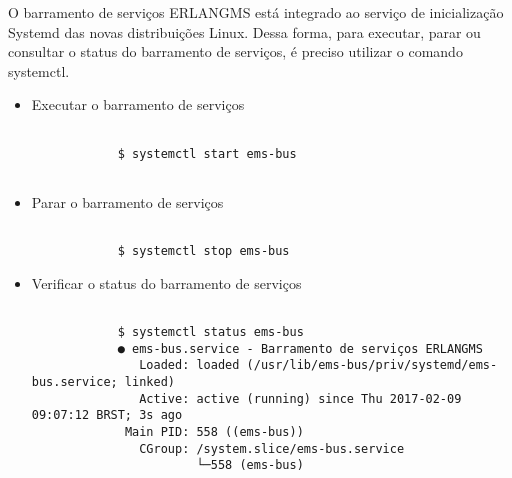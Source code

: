 O barramento de
serviços ERLANGMS está integrado ao serviço de inicialização Systemd das novas distribuições Linux. Dessa forma,
para executar, parar ou consultar o status do barramento de serviços,
é preciso utilizar o comando systemctl.

\begin{itemize}


	\item  Executar o barramento de serviços

	
		\renewcommand{\lstlistingname}{Código}             
		\begin{lstlisting}[Executar o barramento de serviços, label=exec_emsbus] 

			$ systemctl start ems-bus
			
		\end{lstlisting}	

	
	\item  Parar o barramento de serviços
	
		\renewcommand{\lstlistingname}{Código}             
		\begin{lstlisting}[Parar o barramento de serviços, label=stop_emsbus] 

			$ systemctl stop ems-bus

		\end{lstlisting}	
	

	\item  Verificar o status do barramento de serviços
	
		\renewcommand{\lstlistingname}{Código}             
		\begin{lstlisting}[Verificar o status do barramento de serviços, label=status_emsbus] 

			$ systemctl status ems-bus
			● ems-bus.service - Barramento de serviços ERLANGMS
			   Loaded: loaded (/usr/lib/ems-bus/priv/systemd/ems-bus.service; linked)
			   Active: active (running) since Thu 2017-02-09 09:07:12 BRST; 3s ago
			 Main PID: 558 ((ems-bus))
			   CGroup: /system.slice/ems-bus.service
					   └─558 (ems-bus)			

		\end{lstlisting}	
		
		
	
\end{itemize}

